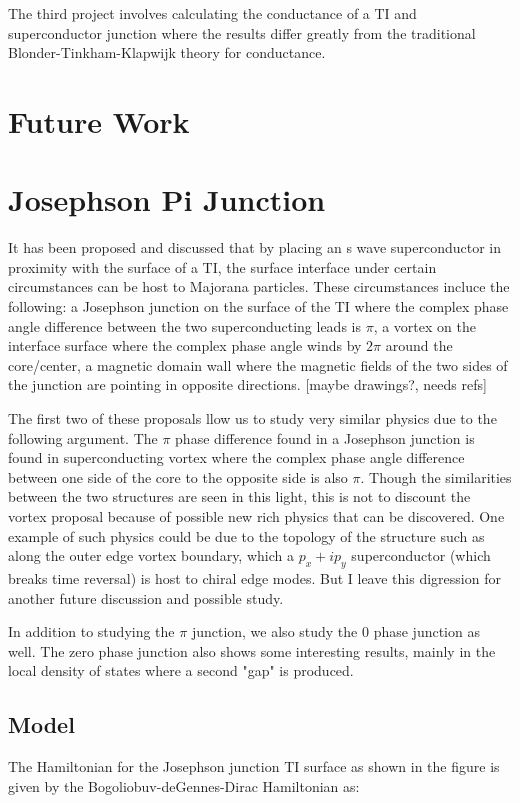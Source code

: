 \documentclass[12pt,twocolumn]{article}
\begin{document}
The third project involves calculating the conductance of a TI  and superconductor junction where the results differ greatly from the traditional Blonder-Tinkham-Klapwijk theory for conductance. 

\clearpage
\section{Future Work}
\section{Josephson Pi Junction}
It has been proposed and discussed that by placing an s wave superconductor in proximity with the surface of a TI, the surface interface under certain circumstances can be host to Majorana particles. These circumstances incluce the following: a Josephson junction on the surface of the TI where the complex phase angle difference between the two superconducting leads is $\pi$, a vortex on the interface surface where the complex phase angle winds by $2 \pi$ around the core/center, a magnetic domain wall where the magnetic fields of the two sides of the junction are pointing in opposite directions. [maybe drawings?, needs refs]

The first two of these proposals llow us to study very similar physics due to the following argument. The $\pi$ phase difference found in a Josephson junction is found in superconducting vortex where the complex phase angle difference between one side of the core to the opposite side is also $\pi$. Though the similarities between the two structures are seen in this light, this is not to discount the vortex proposal because of possible new rich physics that can be discovered. One example of such physics could be due to the topology of the structure such as along the outer edge vortex boundary, which a $p_x+i p_y$ superconductor (which breaks time reversal) is host to chiral edge modes. But I leave this digression for another future discussion and possible study. 

In addition to studying the $\pi$ junction, we also study the 0 phase junction as well. The zero phase junction also shows some interesting results, mainly in the local density of states where a second "gap" is produced. 

\subsection{Model}
The Hamiltonian for the Josephson junction TI surface as shown in the figure is given by the Bogoliobuv-deGennes-Dirac Hamiltonian as:
\end{document}
